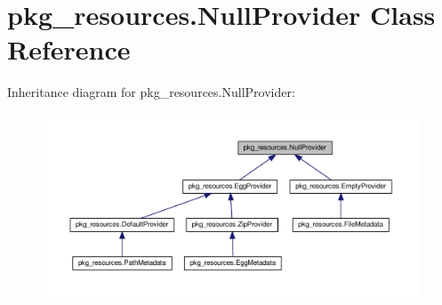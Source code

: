 \hypertarget{classpkg__resources_1_1NullProvider}{}\section{pkg\+\_\+resources.\+Null\+Provider Class Reference}
\label{classpkg__resources_1_1NullProvider}


Inheritance diagram for pkg\+\_\+resources.\+Null\+Provider\+:
\nopagebreak
\begin{figure}[H]
\begin{center}
\leavevmode
\includegraphics[width=350pt]{classpkg__resources_1_1NullProvider__inherit__graph}
\end{center}
\end{figure}

